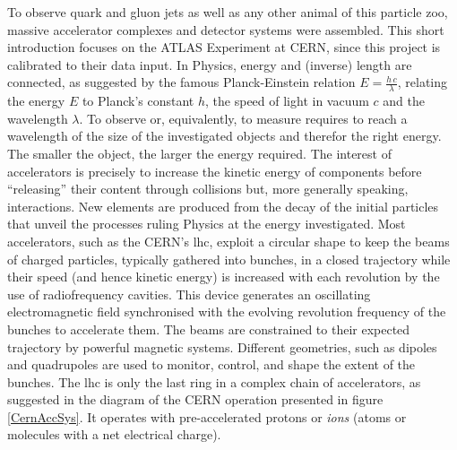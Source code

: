 
To observe quark and gluon jets as well as any other animal of this particle zoo, massive accelerator complexes and detector systems were assembled. This short introduction focuses on the ATLAS Experiment at CERN, since this project is calibrated to their data input. In Physics, energy and (inverse) length are connected, as suggested by the famous Planck-Einstein relation $E = \frac{h \, c}{\lambda}$, relating the energy $E$ to Planck's constant $h$, the speed of light in vacuum $c$ and the wavelength $\lambda$. To observe or, equivalently, to measure requires to reach a wavelength of the size of the investigated objects and therefor the right energy. The smaller the object, the larger the energy required. The interest of accelerators is precisely to increase the kinetic energy of components before ``releasing'' their content through collisions but, more generally speaking, interactions. New elements are produced from the decay of the initial particles that unveil the processes ruling Physics at the energy investigated. Most accelerators, such as the CERN's \gls{lhc}, exploit a circular shape to keep the beams of charged particles, typically gathered into bunches, in a closed trajectory while their speed (and hence kinetic energy) is increased with each revolution by the use of radiofrequency cavities. This device generates an oscillating electromagnetic field synchronised with the evolving revolution frequency of the bunches to accelerate them. The beams are constrained to their expected trajectory by powerful magnetic systems. Different geometries, such as dipoles and quadrupoles are used to monitor, control, and shape the extent of the bunches. The \gls{lhc} is only the last ring in a complex chain of accelerators, as suggested in the diagram of the CERN operation presented in figure \ref{CernAccSys}. It operates with pre-accelerated protons or \textit{ions} (atoms or molecules with a net electrical charge). 

